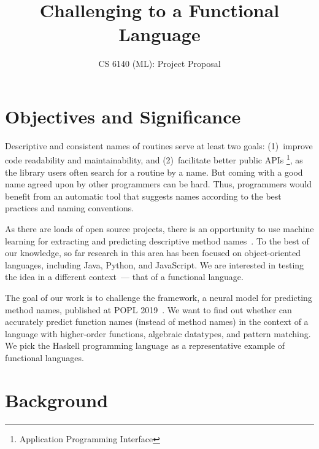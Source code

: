 \documentclass[12pt]{article}
\title{Challenging \cv to a Functional Language}
\author{CS 6140 (ML): Project Proposal}
\date{}%
\begin{document}

{\let\newpage\relax\maketitle}

\section{Objectives and Significance}



Descriptive and consistent names of routines serve at least two goals:
(1)~improve code readability and maintainability, 
and (2)~facilitate better public APIs%
\footnote{Application Programming Interface},
as the library users often search for a routine by a name.
But coming with a good name agreed upon by other programmers can be hard.
Thus, programmers would benefit from an automatic tool 
that suggests names according to the best practices and naming conventions.

As there are loads of open source projects, there is an opportunity
to use machine learning for extracting and predicting descriptive 
method names~\cite{Allamanis2015,Alon2018,code2vec}.
To the best of our knowledge, so far research in this area has been focused 
on object-oriented languages, including Java, Python, and JavaScript.
We are interested in testing the idea in a different context~--- 
that of a functional language. 

The goal of our work is to challenge the \cv framework,
a neural model for predicting method names, published at POPL 2019~\cite{code2vec}.
We want to find out whether \cv can accurately predict
function names (instead of method names) in the context
of a language with higher-order functions,
algebraic datatypes, and pattern matching.
We pick the Haskell programming language as a representative example
of functional languages.



\section{Background}
\end{document}
